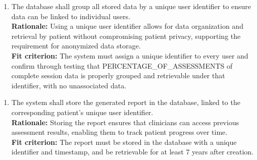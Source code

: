 \documentclass[12pt]{article}
\begin{document}
\begin{enumerate}[label={FR-DSC}4. ]
  \item The database shall group all stored data by a unique user identifier to ensure data can be linked to 
  individual users.\\
  \textbf{Rationale: }Using a unique user identifier allows for data organization and retrieval by patient without 
  compromising patient privacy, supporting the requirement for anonymized data storage.\\
  \textbf{Fit criterion: }The system must assign a unique identifier to every user and confirm through testing 
  that PERCENTAGE\_OF\_ASSESSMENTS of complete session data is properly grouped and retrievable under that identifier, with no unassociated 
  data.
\end{enumerate}
\begin{enumerate}[label={FR-DSC}5. ]
  \item The system shall store the generated report in the database, linked to the corresponding patient’s unique user identifier.\\
  \textbf{Rationale: }Storing the report ensures that clinicians can access previous assessment results, enabling them to track patient progress over time.\\
  \textbf{Fit criterion: }The report must be stored in the database with a unique identifier and timestamp, and be retrievable for at least 7 years after creation.
\end{enumerate}
\end{document}

